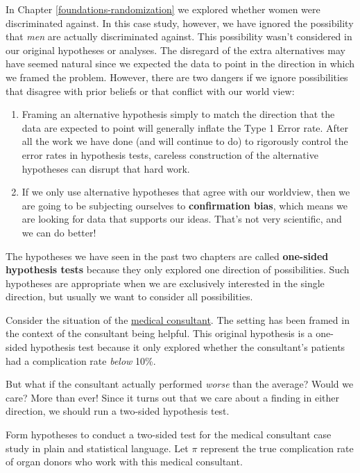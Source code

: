 \documentclass[
  10pt,
  openany]{book}
\theoremstyle{definition}
\theoremstyle{definition}
\theoremstyle{definition}
\theoremstyle{definition}
\theoremstyle{remark}
\begin{document}

In Chapter \ref{foundations-randomization} we explored whether women were discriminated against.
In this case study, however, we have ignored the possibility that \emph{men} are actually discriminated against. This possibility wasn't considered in our original hypotheses or analyses.
The disregard of the extra alternatives may have seemed natural since we expected the data to point in the direction in which we framed the problem.
However, there are two dangers if we ignore possibilities that disagree with prior beliefs or that conflict with our world view:

\begin{enumerate}
\def\labelenumi{\arabic{enumi}.}
\item
  Framing an alternative hypothesis simply to match the direction that the data are expected to point will generally inflate the Type 1 Error rate.
  After all the work we have done (and will continue to do) to rigorously control the error rates in hypothesis tests, careless construction of the alternative hypotheses can disrupt that hard work.
\item
  If we only use alternative hypotheses that agree with our worldview, then we are going to be subjecting ourselves to \textbf{confirmation bias}, which means we are looking for data that supports our ideas.
  That's not very scientific, and we can do better!
\end{enumerate}

The hypotheses we have seen in the past two chapters are called \textbf{one-sided hypothesis tests} because they only explored one direction of possibilities.
Such hypotheses are appropriate when we are exclusively interested in the single direction, but usually we want to consider all possibilities.

Consider the situation of the \hyperref[case-study-med-consult-test]{medical consultant}. The setting has been framed in the context of the consultant being helpful. This original hypothesis is a one-sided hypothesis test because it only explored whether the consultant's patients had a complication rate \emph{below} 10\%.

But what if the consultant actually performed \emph{worse} than the average? Would we care? More than ever! Since it turns out that we care about a finding in either direction, we should run a two-sided hypothesis test.

Form hypotheses to conduct a two-sided test for the medical consultant case study in plain and statistical language. Let \(\pi\) represent the true complication rate of organ donors who work with this medical consultant.
\end{document}
